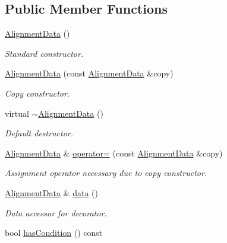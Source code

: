\subsection*{Public Member Functions}
\begin{DoxyCompactItemize}
\item 
\hyperlink{class_d_d4hep_1_1_alignments_1_1_alignment_data_a0147080f238040fbab7467bb22ade3dc}{Alignment\+Data} ()
\begin{DoxyCompactList}\small\item\em Standard constructor. \end{DoxyCompactList}\item 
\hyperlink{class_d_d4hep_1_1_alignments_1_1_alignment_data_a5bb5d24d5baeef53da5feac655612362}{Alignment\+Data} (const \hyperlink{class_d_d4hep_1_1_alignments_1_1_alignment_data}{Alignment\+Data} \&copy)
\begin{DoxyCompactList}\small\item\em Copy constructor. \end{DoxyCompactList}\item 
virtual \hyperlink{class_d_d4hep_1_1_alignments_1_1_alignment_data_a1bbd0f76cea046a48fdeee46396b6e5c}{$\sim$\+Alignment\+Data} ()
\begin{DoxyCompactList}\small\item\em Default destructor. \end{DoxyCompactList}\item 
\hyperlink{class_d_d4hep_1_1_alignments_1_1_alignment_data}{Alignment\+Data} \& \hyperlink{class_d_d4hep_1_1_alignments_1_1_alignment_data_a52c323f2dd5393ea5d9e77f8df11c6d0}{operator=} (const \hyperlink{class_d_d4hep_1_1_alignments_1_1_alignment_data}{Alignment\+Data} \&copy)
\begin{DoxyCompactList}\small\item\em Assignment operator necessary due to copy constructor. \end{DoxyCompactList}\item 
\hyperlink{class_d_d4hep_1_1_alignments_1_1_alignment_data}{Alignment\+Data} \& \hyperlink{class_d_d4hep_1_1_alignments_1_1_alignment_data_a9149a3648883a4d6d941e9b1270599b4}{data} ()
\begin{DoxyCompactList}\small\item\em Data accessor for decorator. \end{DoxyCompactList}\item 
bool \hyperlink{class_d_d4hep_1_1_alignments_1_1_alignment_data_a6429a147760dfb958e1aea96a6501836}{has\+Condition} () const

\end{DoxyCompactItemize}
